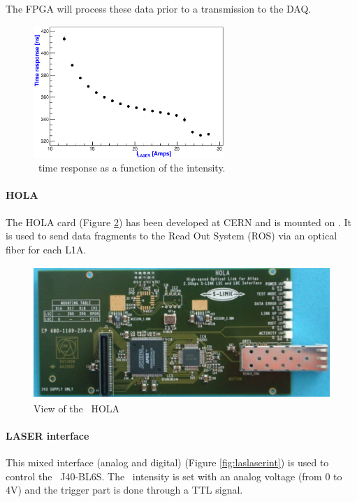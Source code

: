 The FPGA will process these data prior to  a transmission to the DAQ.

\begin{figure}[htbp]
\centering
\includegraphics[height=5cm]{figures/laser_timing_new.eps}
\caption{\las~time response as a function of the intensity.}\label{fig:lasresponse}
\end{figure}


\paragraph{HOLA}

The HOLA card \cite{ref:hola} (Figure \ref{fig:laslascarhola}) has been developed at CERN and is mounted on \lascar. It is used to send data fragments to the Read Out System (ROS) via an optical fiber for each L1A.
\begin{figure}[htbp]

\centering
\includegraphics[height=5cm]{figures/hola.pdf}
\caption{View of the \lascar~HOLA}\label{fig:laslascarhola}
\end{figure}

\paragraph{LASER interface}

This mixed interface (analog and digital) (Figure \ref{fig:laslaserint}) is used to control the \laser~J40-BL6S. The \laser~intensity is set with an analog voltage (from 0 to 4V) and the trigger part is done through a TTL signal.

